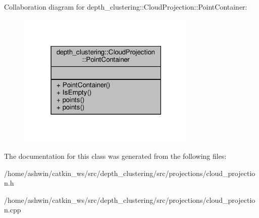 Collaboration diagram for depth\+\_\+clustering\+:\+:Cloud\+Projection\+:\+:Point\+Container\+:\nopagebreak
\begin{figure}[H]
\begin{center}
\leavevmode
\includegraphics[width=243pt]{classdepth__clustering_1_1CloudProjection_1_1PointContainer__coll__graph}
\end{center}
\end{figure}


The documentation for this class was generated from the following files\+:\begin{DoxyCompactItemize}
\item 
/home/ashwin/catkin\+\_\+ws/src/depth\+\_\+clustering/src/projections/cloud\+\_\+projection.\+h\item 
/home/ashwin/catkin\+\_\+ws/src/depth\+\_\+clustering/src/projections/cloud\+\_\+projection.\+cpp\end{DoxyCompactItemize}
